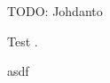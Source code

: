 TODO: Johdanto

Test \parencite{AnsibleDocs,alma9911217298805973,KiefMorris2020IaC2,RahmanAkond2021SSiA,JamesFreeman2020HEAo,GauravAgarwal2021MDP,JamesFreeman2020PA2}.

asdf